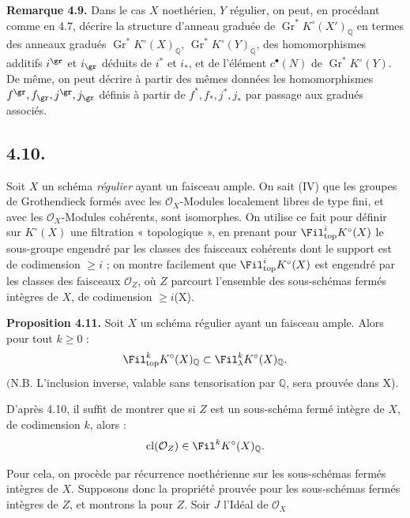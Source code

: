 \textbf{Remarque 4.9.} Dans le cas \(X\) noethérien, \(Y\) régulier, on peut, en procédant comme en 4.7, décrire la structure d'anneau graduée de \(\operatorname{Gr}^*K^\circ(X')_{\mathbb Q}\) en termes des anneaux gradués \(\operatorname{Gr}^*K^\circ(X)_{\mathbb Q}\), \(\operatorname{Gr}^*K^\circ(Y)_{\mathbb Q}\), des homomorphismes additifs \(i^{\gr}\) et \(i_{\gr}\) déduits de \(i^*\) et \(i_*\), et de l'élément \(c^{\bullet}(N)\) de \(\operatorname{Gr}^*K^\circ(Y)\). De même, on peut décrire à partir des mêmes données les homomorphismes \(f^{\gr},f_{\gr},j^{\gr},j_{\gr}\) définis à partir de \(f^*,f_*,j^*,j_*\) par passage aux gradués associés.

\subsection*{4.10.}

Soit \(X\) un schéma \emph{régulier} ayant un faisceau ample. On sait (IV\qquad) que les groupes de Grothendieck formés avec les \(\mathcal O_X\)-Modules localement libres de type fini, et avec les \(\mathcal O_X\)-Modules cohérents, sont isomorphes. On utilise ce fait pour définir sur \(K^\circ(X)\) une filtration « topologique », en prenant pour \(\Fil^i_{\mathrm{top}}K^\circ(X)\) le sous-groupe engendré par les classes des faisceaux cohérents dont le support est de codimension \(\ge i\) ; on montre facilement que \(\Fil^i_{\mathrm{top}}K^\circ(X)\) est engendré par les classes des faisceaux \(\mathcal O_Z\), où \(Z\) parcourt l'ensemble des sous-schémas fermés intègres de \(X\), de codimension \(\ge i\)(X\qquad).

\textbf{Proposition 4.11.} Soit \(X\) un schéma régulier ayant un faisceau ample. Alors pour tout \(k\ge0\) :
\[
  \Fil_{\mathrm{top}}^kK^\circ(X)_{\mathbb Q}
  \subset
  \Fil_\lambda^kK^\circ(X)_{\mathbb Q}.
\]
\((\mathrm{N.B.}\) L'inclusion inverse, valable sans tensorisation par \(\mathbb Q\), sera prouvée dans X\qquad).

D'après 4.10, il suffit de montrer que si \(Z\) est un sous-schéma fermé intègre de \(X\), de codimension \(k\), alors :
\[
  \operatorname{cl}(\mathcal O_Z)\in\Fil^kK^\circ(X)_{\mathbb Q}.
\]

Pour cela, on procède par récurrence noethérienne sur les sous-schémas fermés intègres de \(X\). Supposons donc la propriété prouvée pour les sous-schémas fermés intègres de \(Z\), et montrons la pour \(Z\). Soir \(J\) l'Idéal de \(\mathcal O_X\)
